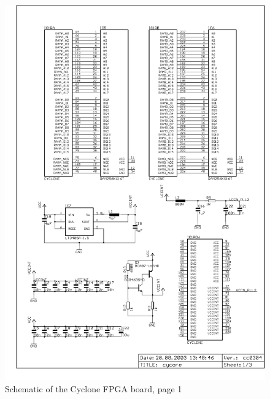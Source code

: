 \begin{figure}
    \centering
    \includegraphics[scale=0.87]{appendix/cycore_p1}
    \caption{Schematic of the Cyclone FPGA board, page 1}
\end{figure}
